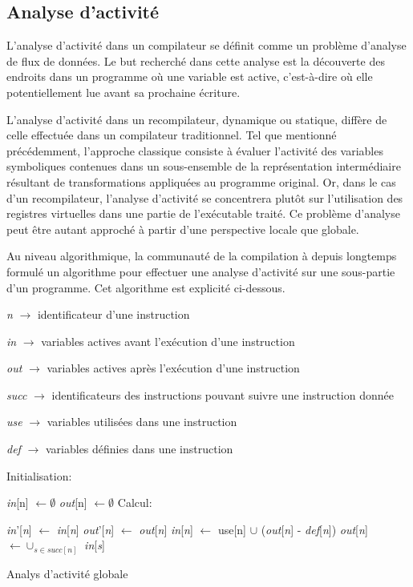\documentclass{article} %
\begin{document}
\subsection{Analyse d'activité}
L'analyse d'activité dans un compilateur se définit comme un problème d'analyse de flux de données. Le but recherché dans cette analyse est la découverte des endroits dans un programme où une variable est active, c'est-à-dire où elle potentiellement lue avant sa prochaine écriture.

L'analyse d'activité dans un recompilateur, dynamique ou statique, diffère de celle effectuée dans un compilateur traditionnel. Tel que mentionné précédemment, l'approche classique consiste à évaluer l'activité des variables symboliques contenues dans un sous-ensemble de la représentation intermédiaire résultant de transformations appliquées au programme original. Or, dans le cas d'un recompilateur, l'analyse d'activité se concentrera plutôt sur l'utilisation des registres virtuelles dans une partie de l'exécutable traité. Ce problème d'analyse peut être autant approché à partir d'une perspective locale que globale.

Au niveau algorithmique, la communauté de la compilation à depuis longtemps formulé un algorithme pour effectuer une analyse d'activité sur une sous-partie d'un programme. Cet algorithme est explicité ci-dessous.

\begin{algorithm}[H]
 \KwData
 {
 	
 	\textit{n} $\rightarrow$ identificateur d'une instruction
 
	\textit{in} $\rightarrow$ variables actives avant l'exécution d'une instruction

 	\textit{out} $\rightarrow$ variables actives après l'exécution d'une instruction
 	
 	\textit{succ} $\rightarrow$ identificateurs des instructions pouvant suivre une instruction donnée
 	
 	\textit{use} $\rightarrow$ variables utilisées dans une instruction
 	
 	\textit{def} $\rightarrow$ variables définies dans une instruction
 }
 Initialisation:
 
 {
 	\textit{in}[n] $\leftarrow \emptyset$\;
 	\textit{out}[n] $\leftarrow \emptyset$\;
 }
 Calcul:
 
 {
  	{
  		\textit{in}'[\textit{n}] $\leftarrow$ \textit{in}[\textit{n}]\;
  		\textit{out}'[\textit{n}] $\leftarrow$ \textit{out}[\textit{n}]\;
  		\textit{in}[\textit{n}] $\leftarrow$ use[n] $\cup$ (\textit{out}[\textit{n}] - \textit{def}[\textit{n}])\;
  		\textit{out}[\textit{n}] $\leftarrow \cup_{s \in succ[n]}$ \textit{in}[\textit{s}]\;
  	}
 }
 \caption{Analys d'activité globale}
\end{algorithm}
\end{document}
